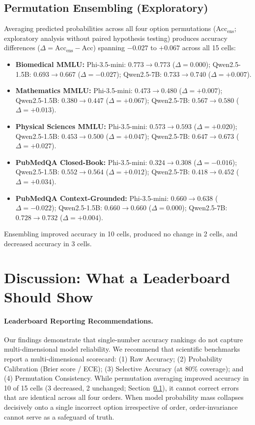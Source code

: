 \documentclass[sigconf,nonacm]{acmart}
\makeatletter
\DeclareRobustCommand{\_}{\ifmmode\nfss@text{\textunderscore}\else\textunderscore\allowbreak\fi}
\makeatother
\begin{document}
\subsection{Permutation Ensembling (Exploratory)}
\label{sec:ensembling}
Averaging predicted probabilities across all four option permutations ($\text{Acc}_{\text{ens}}$; exploratory analysis without paired hypothesis testing) produces accuracy differences ($\Delta = \text{Acc}_{\text{ens}} - \text{Acc}$) spanning $-0.027$ to $+0.067$ across all 15 cells:
\begin{itemize}
    \item \textbf{Biomedical MMLU:} \textsf{Phi-3.5-mini}: $0.773 \to 0.773$ ($\Delta = 0.000$); \textsf{Qwen2.5-1.5B}: $0.693 \to 0.667$ ($\Delta = -0.027$); \textsf{Qwen2.5-7B}: $0.733 \to 0.740$ ($\Delta = +0.007$).
    \item \textbf{Mathematics MMLU:} \textsf{Phi-3.5-mini}: $0.473 \to 0.480$ ($\Delta = +0.007$); \textsf{Qwen2.5-1.5B}: $0.380 \to 0.447$ ($\Delta = +0.067$); \textsf{Qwen2.5-7B}: $0.567 \to 0.580$ ($\Delta = +0.013$).
    \item \textbf{Physical Sciences MMLU:} \textsf{Phi-3.5-mini}: $0.573 \to 0.593$ ($\Delta = +0.020$); \textsf{Qwen2.5-1.5B}: $0.453 \to 0.500$ ($\Delta = +0.047$); \textsf{Qwen2.5-7B}: $0.647 \to 0.673$ ($\Delta = +0.027$).
    \item \textbf{PubMedQA Closed-Book:} \textsf{Phi-3.5-mini}: $0.324 \to 0.308$ ($\Delta = -0.016$); \textsf{Qwen2.5-1.5B}: $0.552 \to 0.564$ ($\Delta = +0.012$); \textsf{Qwen2.5-7B}: $0.418 \to 0.452$ ($\Delta = +0.034$).
    \item \textbf{PubMedQA Context-Grounded:} \textsf{Phi-3.5-mini}: $0.660 \to 0.638$ ($\Delta = -0.022$); \textsf{Qwen2.5-1.5B}: $0.660 \to 0.660$ ($\Delta = 0.000$); \textsf{Qwen2.5-7B}: $0.728 \to 0.732$ ($\Delta = +0.004$).
\end{itemize}
Ensembling improved accuracy in 10 cells, produced no change in 2 cells, and decreased accuracy in 3 cells.

\section{Discussion: What a Leaderboard Should Show}
\paragraph{Leaderboard Reporting Recommendations.}
Our findings demonstrate that single-number accuracy rankings do not capture multi-dimensional model reliability. We recommend that scientific benchmarks report a multi-dimensional scorecard: (1) Raw Accuracy; (2) Probability Calibration (Brier score / ECE); (3) Selective Accuracy (at 80\% coverage); and (4) Permutation Consistency. While permutation averaging improved accuracy in 10 of 15 cells (3 decreased, 2 unchanged; Section~\ref{sec:ensembling}), it cannot correct errors that are identical across all four orders. When model probability mass collapses decisively onto a single incorrect option irrespective of order, order-invariance cannot serve as a safeguard of truth.
\end{document}
